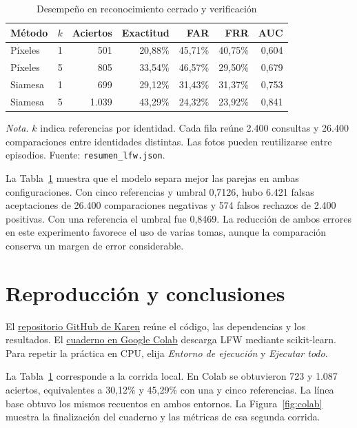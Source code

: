 \documentclass[12pt,letterpaper]{article}
\begin{document}
\begin{table}[H]
\caption{Desempeño en reconocimiento cerrado y verificación}\label{tab:resultados}
\centering\small
\begin{tabular}{lrrrrrr}\toprule
Método & $k$ & Aciertos & Exactitud & FAR & FRR & AUC\\\midrule
Píxeles & 1 & 501 & 20,88\% & 45,71\% & 40,75\% & 0,604\\
Píxeles & 5 & 805 & 33,54\% & 46,57\% & 29,50\% & 0,679\\
Siamesa & 1 & 699 & 29,12\% & 31,43\% & 31,37\% & 0,753\\
Siamesa & 5 & 1.039 & 43,29\% & 24,32\% & 23,92\% & 0,841\\\bottomrule
\end{tabular}
\par\vspace{4pt}\raggedright\footnotesize\textit{Nota.} $k$ indica referencias por identidad. Cada fila reúne 2.400 consultas y 26.400 comparaciones entre identidades distintas. Las fotos pueden reutilizarse entre episodios. Fuente: \texttt{resumen\_lfw.json}.
\end{table}

La Tabla~\ref{tab:resultados} muestra que el modelo separa mejor las parejas en ambas configuraciones. Con cinco referencias y umbral 0,7126, hubo 6.421 falsas aceptaciones de 26.400 comparaciones negativas y 574 falsos rechazos de 2.400 positivas. Con una referencia el umbral fue 0,8469. La reducción de ambos errores en este experimento favorece el uso de varias tomas, aunque la comparación conserva un margen de error considerable.

\section{Reproducción y conclusiones}
El \href{https://github.com/sofiadelcal/karen-calidad-imagenes-publicas-s10}{repositorio GitHub de Karen} reúne el código, las dependencias y los resultados. El \href{https://colab.research.google.com/github/sofiadelcal/karen-calidad-imagenes-publicas-s10/blob/main/Karen_Siamesa_LFW.ipynb}{cuaderno en Google Colab} descarga LFW mediante scikit-learn. Para repetir la práctica en CPU, elija \textit{Entorno de ejecución} y \textit{Ejecutar todo}.

La Tabla~\ref{tab:resultados} corresponde a la corrida local. En Colab se obtuvieron 723 y 1.087 aciertos, equivalentes a 30,12\% y 45,29\% con una y cinco referencias. La línea base obtuvo los mismos recuentos en ambos entornos. La Figura~\ref{fig:colab} muestra la finalización del cuaderno y las métricas de esa segunda corrida.
\end{document}
